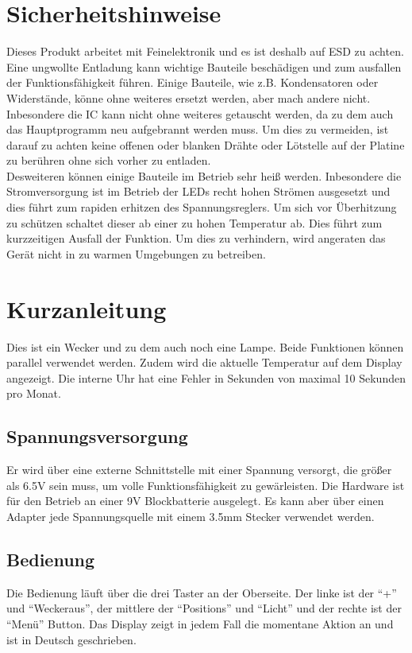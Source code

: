 \documentclass[12pt,a4paper,titlepage,headinclude]{scrartcl}
\numberwithin{equation}{subsection}
\begin{document}
\section{Sicherheitshinweise}
\label{sec:sicherheitshinweise}
Dieses Produkt arbeitet mit Feinelektronik und es ist deshalb auf ESD zu achten.
Eine ungwollte Entladung kann wichtige Bauteile beschädigen und zum ausfallen der Funktionsfähigkeit führen.
Einige Bauteile, wie z.B. Kondensatoren oder Widerstände, könne ohne weiteres ersetzt werden, aber mach andere nicht.
Inbesondere die IC kann nicht ohne weiteres getauscht werden, da zu dem auch das Hauptprogramm neu aufgebrannt werden muss.
Um dies zu vermeiden, ist darauf zu achten keine offenen oder blanken Drähte oder Lötstelle auf der Platine zu berühren ohne sich vorher zu entladen.\\
Desweiteren können einige Bauteile im Betrieb sehr heiß werden.
Inbesondere die Stromversorgung ist im Betrieb der LEDs recht hohen Strömen ausgesetzt und dies führt zum rapiden erhitzen des Spannungsreglers.
Um sich vor Überhitzung zu schützen schaltet dieser ab einer zu hohen Temperatur ab.
Dies führt zum kurzzeitigen Ausfall der Funktion.
Um dies zu verhindern, wird angeraten das Gerät nicht in zu warmen Umgebungen zu betreiben.


\section{Kurzanleitung}
\label{sec:kurzanleitung}
Dies ist ein Wecker und zu dem auch noch eine Lampe.
Beide Funktionen können parallel verwendet werden.
Zudem wird die aktuelle Temperatur auf dem Display angezeigt.
Die interne Uhr hat eine Fehler in Sekunden von maximal 10 Sekunden pro Monat.

\subsection{Spannungsversorgung}
Er wird über eine externe Schnittstelle mit einer Spannung versorgt, die größer als 6.5\si{\volt} sein muss, um volle Funktionsfähigkeit zu gewärleisten.
Die Hardware ist für den Betrieb an einer 9\si{\volt} Blockbatterie ausgelegt.
Es kann aber über einen Adapter jede Spannungsquelle mit einem 3.5\si{\milli\meter} Stecker verwendet werden.

\subsection{Bedienung}
Die Bedienung läuft über die drei Taster an der Oberseite.
Der linke ist der "`+"' und "`Weckeraus"', der mittlere der "`Positions"' und "`Licht"' und der rechte ist der "`Menü"' Button.
Das Display zeigt in jedem Fall die momentane Aktion an und ist in Deutsch geschrieben.
\end{document}
